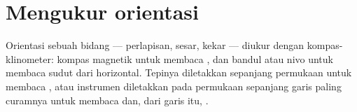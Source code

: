 \section{Mengukur orientasi}

Orientasi sebuah bidang --- perlapisan, sesar, kekar --- diukur dengan kompas-klinometer: kompas magnetik untuk membaca , dan bandul atau nivo untuk membaca sudut dari horizontal. Tepinya diletakkan sepanjang  permukaan untuk membaca , atau instrumen diletakkan pada permukaan sepanjang garis paling curamnya untuk membaca  dan, dari  garis itu, .

